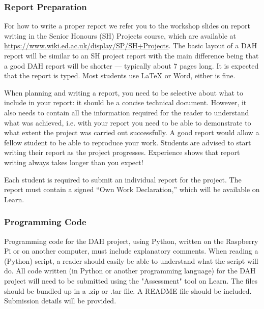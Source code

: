 \newpage
\subsubsection{Report Preparation}

For how to write a proper report we refer you to the workshop slides on report writing in the Senior Honours (SH) Projects course, which are available at \url{https://www.wiki.ed.ac.uk/display/SP/SH+Projects}.
The basic layout of a DAH report will be similar to an SH project report with the main difference being that a good DAH report will be shorter --- typically about 7 pages long.
It is expected that the report is typed.
Most students use LaTeX or Word, either is fine.

When planning and writing a report, you need to be selective about what to include in your report: it should be a concise technical document.
However, it also needs to contain all the information required for the reader to understand what was achieved, i.e. with your report you need to be able to demonstrate to what extent the project was carried out successfully.
A good report would allow a fellow student to be able to reproduce your work.
Students are advised to start writing their report as the project progresses.
Experience shows that report writing always takes longer than you expect!

Each student is required to submit an individual report for the project.
The report must contain a signed ``Own Work Declaration,'' which will be available on Learn.

\subsubsection{Programming Code}

Programming code for the DAH project, using Python, written on the Raspberry Pi or on another computer, must include explanatory comments.
When reading a (Python) script, a reader should easily be able to understand what the script will do.
All code written (in Python or another programming language) for the DAH project will need to be submitted using the "Assessment" tool on Learn.
The files should be bundled up in a .zip or .tar file.
A README file should be included.
Submission details will be provided.


